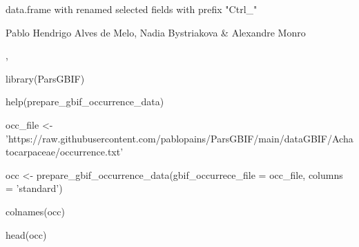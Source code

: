 \documentclass[a4paper]{book}
\begin{document}
%
\begin{Value}
data.frame with renamed selected fields with prefix "Ctrl\_"
\end{Value}
%
\begin{Author}
Pablo Hendrigo Alves de Melo,
Nadia Bystriakova \&
Alexandre Monro
\end{Author}
%
\begin{SeeAlso}
, 
\end{SeeAlso}
%
\begin{Examples}
\begin{ExampleCode}


library(ParsGBIF)

help(prepare_gbif_occurrence_data)

occ_file <- 'https://raw.githubusercontent.com/pablopains/ParsGBIF/main/dataGBIF/Achatocarpaceae/occurrence.txt'

occ <- prepare_gbif_occurrence_data(gbif_occurrece_file = occ_file,
                                    columns = 'standard')

colnames(occ)

head(occ)

\end{ExampleCode}
\end{Examples}
%
\end{document}

